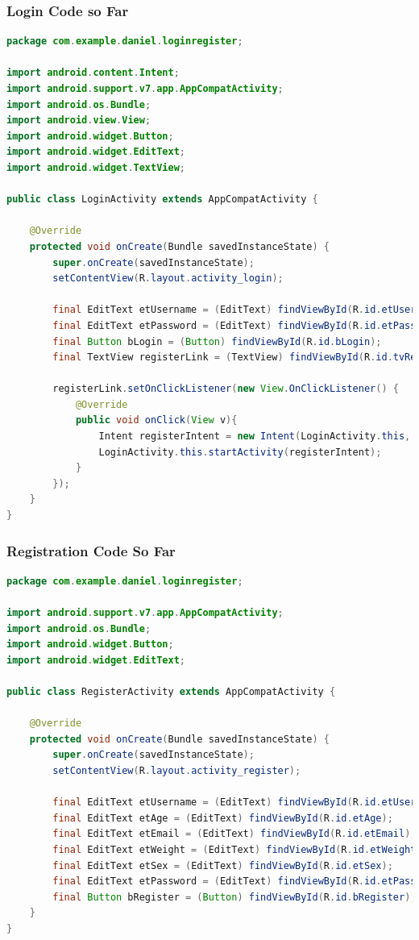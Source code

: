 ﻿\documentclass{article}
\begin{document}
\subsubsection{Login Code so Far}
\begin{lstlisting}[language = Java]
package com.example.daniel.loginregister;

import android.content.Intent;
import android.support.v7.app.AppCompatActivity;
import android.os.Bundle;
import android.view.View;
import android.widget.Button;
import android.widget.EditText;
import android.widget.TextView;

public class LoginActivity extends AppCompatActivity {

    @Override
    protected void onCreate(Bundle savedInstanceState) {
        super.onCreate(savedInstanceState);
        setContentView(R.layout.activity_login);

        final EditText etUsername = (EditText) findViewById(R.id.etUsername);
        final EditText etPassword = (EditText) findViewById(R.id.etPassword);
        final Button bLogin = (Button) findViewById(R.id.bLogin);
        final TextView registerLink = (TextView) findViewById(R.id.tvRegisterHere);

        registerLink.setOnClickListener(new View.OnClickListener() {
            @Override
            public void onClick(View v){
                Intent registerIntent = new Intent(LoginActivity.this, RegisterActivity.class);
                LoginActivity.this.startActivity(registerIntent);
            }
        });
    }
}
\end{lstlisting}

\subsubsection{Registration Code So Far}
\begin{lstlisting}[language = Java]
package com.example.daniel.loginregister;

import android.support.v7.app.AppCompatActivity;
import android.os.Bundle;
import android.widget.Button;
import android.widget.EditText;

public class RegisterActivity extends AppCompatActivity {

    @Override
    protected void onCreate(Bundle savedInstanceState) {
        super.onCreate(savedInstanceState);
        setContentView(R.layout.activity_register);

        final EditText etUsername = (EditText) findViewById(R.id.etUsername);
        final EditText etAge = (EditText) findViewById(R.id.etAge);
        final EditText etEmail = (EditText) findViewById(R.id.etEmail);
        final EditText etWeight = (EditText) findViewById(R.id.etWeight);
        final EditText etSex = (EditText) findViewById(R.id.etSex);
        final EditText etPassword = (EditText) findViewById(R.id.etPassword);
        final Button bRegister = (Button) findViewById(R.id.bRegister);
    }
}
\end{lstlisting}
\end{document}
